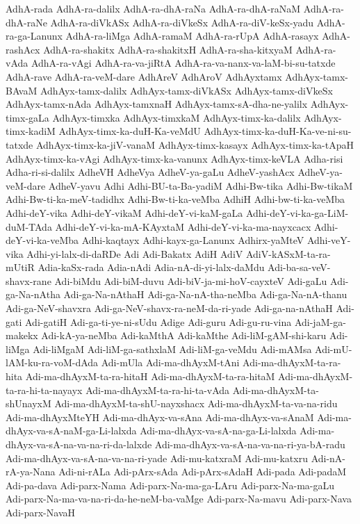 {AdhA-rada
AdhA-ra-dalilx
AdhA-ra-dhA-raNa
AdhA-ra-dhA-raNaM
AdhA-ra-dhA-raNe
AdhA-ra-diVkASx
AdhA-ra-diVkeSx
AdhA-ra-diV-keSx-yadu
AdhA-ra-ga-Lanunx
AdhA-ra-liMga
AdhA-ramaM
AdhA-ra-rUpA
AdhA-rasayx
AdhA-rashAcx
AdhA-ra-shakitx
AdhA-ra-shakitxH
AdhA-ra-sha-kitxyaM
AdhA-ra-vAda
AdhA-ra-vAgi
AdhA-ra-va-jiRtA
AdhA-ra-va-nanx-va-laM-bi-su-tatxde
AdhA-rave
AdhA-ra-veM-dare
AdhAreV
AdhAroV
AdhAyxtamx
AdhAyx-tamx-BAvaM
AdhAyx-tamx-dalilx
AdhAyx-tamx-diVkASx
AdhAyx-tamx-diVkeSx
AdhAyx-tamx-nAda
AdhAyx-tamxnaH
AdhAyx-tamx-sA-dha-ne-yalilx
AdhAyx-timx-gaLa
AdhAyx-timxka
AdhAyx-timxkaM
AdhAyx-timx-ka-dalilx
AdhAyx-timx-kadiM
AdhAyx-timx-ka-duH-Ka-veMdU
AdhAyx-timx-ka-duH-Ka-ve-ni-su-tatxde
AdhAyx-timx-ka-jiV-vanaM
AdhAyx-timx-kasayx
AdhAyx-timx-ka-tApaH
AdhAyx-timx-ka-vAgi
AdhAyx-timx-ka-vanunx
AdhAyx-timx-keVLA
Adha-risi
Adha-ri-si-dalilx
AdheVH
AdheVya
AdheV-ya-gaLu
AdheV-yashAcx
AdheV-ya-veM-dare
AdheV-yavu
Adhi
Adhi-BU-ta-Ba-yadiM
Adhi-Bw-tika
Adhi-Bw-tikaM
Adhi-Bw-ti-ka-meV-tadidhx
Adhi-Bw-ti-ka-veMba
AdhiH
Adhi-bw-ti-ka-veMba
Adhi-deY-vika
Adhi-deY-vikaM
Adhi-deY-vi-kaM-gaLa
Adhi-deY-vi-ka-ga-LiM-duM-TAda
Adhi-deY-vi-ka-mA-KAyxtaM
Adhi-deY-vi-ka-ma-nayxcacx
Adhi-deY-vi-ka-veMba
Adhi-kaqtayx
Adhi-kayx-ga-Lanunx
Adhirx-yaMteV
Adhi-veY-vika
Adhi-yi-lalx-di-daRDe
Adi
Adi-Bakatx
AdiH
AdiV
AdiV-kASxM-ta-ra-mUtiR
Adia-kaSx-rada
Adia-nAdi
Adia-nA-di-yi-lalx-daMdu
Adi-ba-sa-veV-shavx-rane
Adi-biMdu
Adi-biM-duvu
Adi-biV-ja-mi-hoV-cayxteV
Adi-gaLu
Adi-ga-Na-nAtha
Adi-ga-Na-nAthaH
Adi-ga-Na-nA-tha-neMba
Adi-ga-Na-nA-thanu
Adi-ga-NeV-shavxra
Adi-ga-NeV-shavx-ra-neM-da-ri-yade
Adi-ga-na-nAthaH
Adi-gati
Adi-gatiH
Adi-ga-ti-ye-ni-sUdu
Adige
Adi-guru
Adi-gu-ru-vina
Adi-jaM-ga-makekx
Adi-kA-ya-neMba
Adi-kaMthA
Adi-kaMthe
Adi-liM-gAM-shi-karu
Adi-liMga
Adi-liMgaM
Adi-liM-ga-sathxlaM
Adi-liM-ga-veMdu
Adi-mAMsa
Adi-mU-lAM-ku-ra-voM-dAda
Adi-mUla
Adi-ma-dhAyxM-tAni
Adi-ma-dhAyxM-ta-ra-hita
Adi-ma-dhAyxM-ta-ra-hitaH
Adi-ma-dhAyxM-ta-ra-hitaM
Adi-ma-dhAyxM-ta-ra-hi-ta-nayayx
Adi-ma-dhAyxM-ta-ra-hi-ta-vAda
Adi-ma-dhAyxM-ta-shUnayxM
Adi-ma-dhAyxM-ta-shU-nayxshacx
Adi-ma-dhAyxM-ta-va-na-ridu
Adi-ma-dhAyxMteYH
Adi-ma-dhAyx-va-sAna
Adi-ma-dhAyx-va-sAnaM
Adi-ma-dhAyx-va-sA-naM-ga-Li-lalxda
Adi-ma-dhAyx-va-sA-na-ga-Li-lalxda
Adi-ma-dhAyx-va-sA-na-va-na-ri-da-lalxde
Adi-ma-dhAyx-va-sA-na-va-na-ri-ya-bA-radu
Adi-ma-dhAyx-va-sA-na-va-na-ri-yade
Adi-mu-katxraM
Adi-mu-katxru
Adi-nA-rA-ya-Nana
Adi-ni-rALa
Adi-pArx-sAda
Adi-pArx-sAdaH
Adi-pada
Adi-padaM
Adi-pa-dava
Adi-parx-Nama
Adi-parx-Na-ma-ga-LAru
Adi-parx-Na-ma-gaLu
Adi-parx-Na-ma-va-na-ri-da-he-neM-ba-vaMge
Adi-parx-Na-mavu
Adi-parx-Nava
Adi-parx-NavaH
}
